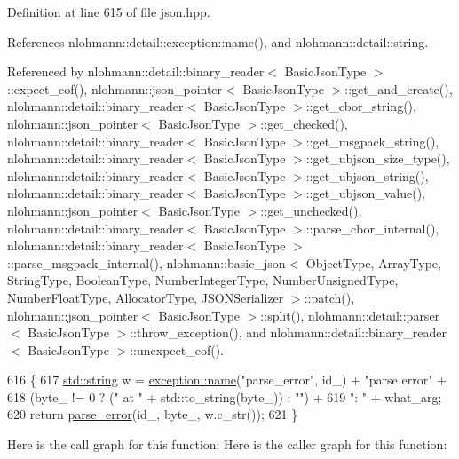 Definition at line 615 of file json.\+hpp.



References nlohmann\+::detail\+::exception\+::name(), and nlohmann\+::detail\+::string.



Referenced by nlohmann\+::detail\+::binary\+\_\+reader$<$ Basic\+Json\+Type $>$\+::expect\+\_\+eof(), nlohmann\+::json\+\_\+pointer$<$ Basic\+Json\+Type $>$\+::get\+\_\+and\+\_\+create(), nlohmann\+::detail\+::binary\+\_\+reader$<$ Basic\+Json\+Type $>$\+::get\+\_\+cbor\+\_\+string(), nlohmann\+::json\+\_\+pointer$<$ Basic\+Json\+Type $>$\+::get\+\_\+checked(), nlohmann\+::detail\+::binary\+\_\+reader$<$ Basic\+Json\+Type $>$\+::get\+\_\+msgpack\+\_\+string(), nlohmann\+::detail\+::binary\+\_\+reader$<$ Basic\+Json\+Type $>$\+::get\+\_\+ubjson\+\_\+size\+\_\+type(), nlohmann\+::detail\+::binary\+\_\+reader$<$ Basic\+Json\+Type $>$\+::get\+\_\+ubjson\+\_\+string(), nlohmann\+::detail\+::binary\+\_\+reader$<$ Basic\+Json\+Type $>$\+::get\+\_\+ubjson\+\_\+value(), nlohmann\+::json\+\_\+pointer$<$ Basic\+Json\+Type $>$\+::get\+\_\+unchecked(), nlohmann\+::detail\+::binary\+\_\+reader$<$ Basic\+Json\+Type $>$\+::parse\+\_\+cbor\+\_\+internal(), nlohmann\+::detail\+::binary\+\_\+reader$<$ Basic\+Json\+Type $>$\+::parse\+\_\+msgpack\+\_\+internal(), nlohmann\+::basic\+\_\+json$<$ Object\+Type, Array\+Type, String\+Type, Boolean\+Type, Number\+Integer\+Type, Number\+Unsigned\+Type, Number\+Float\+Type, Allocator\+Type, J\+S\+O\+N\+Serializer $>$\+::patch(), nlohmann\+::json\+\_\+pointer$<$ Basic\+Json\+Type $>$\+::split(), nlohmann\+::detail\+::parser$<$ Basic\+Json\+Type $>$\+::throw\+\_\+exception(), and nlohmann\+::detail\+::binary\+\_\+reader$<$ Basic\+Json\+Type $>$\+::unexpect\+\_\+eof().


\begin{DoxyCode}
616     \{
617         \hyperlink{namespacenlohmann_1_1detail_a1ed8fc6239da25abcaf681d30ace4985ab45cffe084dd3d20d928bee85e7b0f21}{std::string} w = \hyperlink{classnlohmann_1_1detail_1_1exception_abf41a7e9178356314082284e6cfea278}{exception::name}(\textcolor{stringliteral}{"parse\_error"}, id\_) + \textcolor{stringliteral}{"parse error"} +
618                         (byte\_ != 0 ? (\textcolor{stringliteral}{" at "} + std::to\_string(byte\_)) : \textcolor{stringliteral}{""}) +
619                         \textcolor{stringliteral}{": "} + what\_arg;
620         \textcolor{keywordflow}{return} \hyperlink{classnlohmann_1_1detail_1_1parse__error_a0ea816ea3521d7109407948cb1b850f7}{parse\_error}(id\_, byte\_, w.c\_str());
621     \}
\end{DoxyCode}
Here is the call graph for this function\+:
Here is the caller graph for this function\+:


